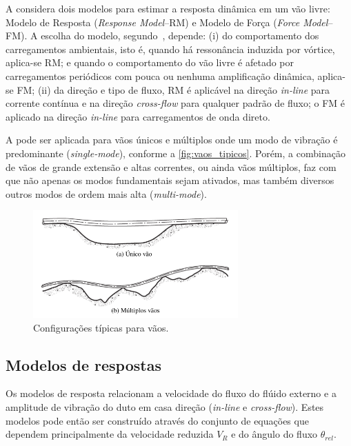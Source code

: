 A  considera dois modelos para estimar a resposta dinâmica em um vão livre: Modelo de Resposta (\textit{Response Model}--RM) e Modelo de Força (\textit{Force Model}--FM).
A escolha do modelo, segundo~, depende: (i) do comportamento dos carregamentos ambientais, isto é, quando há ressonância induzida por vórtice, aplica-se RM\@; e quando o comportamento do vão livre é afetado por carregamentos periódicos com pouca ou nenhuma amplificação dinâmica, aplica-se FM\@; (ii) da direção e tipo de fluxo, RM é aplicável na direção \textit{in-line} para corrente contínua e na direção \textit{cross-flow} para qualquer padrão de fluxo; o FM é aplicado na direção \textit{in-line} para carregamentos de onda direto.

A  pode ser aplicada para vãos únicos e múltiplos onde um modo de vibração é predominante (\textit{single-mode}), conforme a \autoref{fig:vaos_tipicos}.
Porém, a combinação de vãos de grande extensão e altas correntes, ou ainda vãos múltiplos, faz com que não apenas os modos fundamentais sejam ativados, mas também diversos outros modos de ordem mais alta (\textit{multi-mode}).

\begin{figure}[!ht]
	\centering
    \caption{Configurações típicas para vãos.}\label{fig:vaos_tipicos}
	\includegraphics[width=0.7\textwidth]{imagens/vaos_tipicos}
\end{figure}


\subsection{Modelos de respostas}

Os modelos de resposta relacionam a velocidade do fluxo do flúido externo e a amplitude de vibração do duto em casa direção (\textit{in-line} e \textit{cross-flow}). Estes modelos pode então ser construído através do conjunto de equações que dependem principalmente da velocidade reduzida $V_R$ e do ângulo do fluxo $\theta_\mathit{rel}$.

